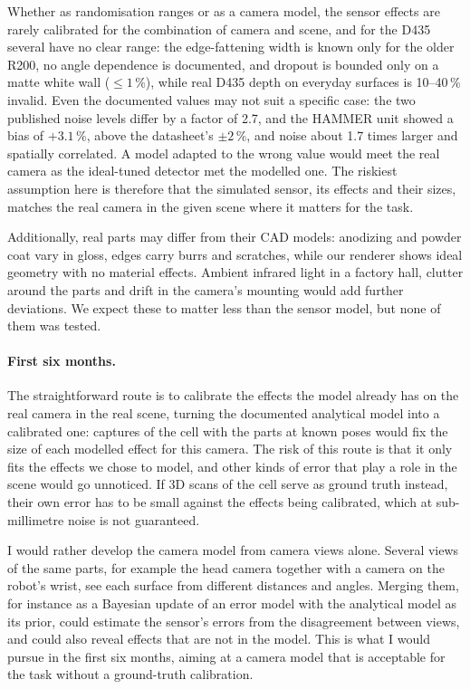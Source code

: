 \documentclass[10pt,a4paper]{article}
\begin{document}
Whether as randomisation ranges or as a camera model, the sensor
effects are rarely calibrated for the combination of camera and scene, and for the D435 several have no clear
range: the edge-fattening width is known only for the older R200, no angle dependence is documented, and
dropout is bounded only on a matte white wall ($\leq 1\,\%$), while real D435 depth on everyday surfaces is
10--40\,\% invalid. Even the documented values may not suit a
specific case: the two published noise levels differ by a factor of 2.7, and the HAMMER unit showed a bias of
$+3.1\,\%$, above the datasheet's $\pm 2\,\%$, and noise about 1.7 times larger and spatially correlated. A model
adapted to the wrong value would meet the real camera as the ideal-tuned detector met the modelled one. The riskiest
assumption here is therefore that the simulated sensor, its effects and their sizes, matches the real camera in the
given scene where it matters for the task.

Additionally, real parts may differ from their CAD models: anodizing and
powder coat vary in gloss, edges carry burrs and scratches, while our renderer shows ideal geometry with no material effects. Ambient infrared light in a factory
hall, clutter around the parts and drift in the camera's mounting would add further deviations. We expect these
to matter less than the sensor model, but none of them was tested.

\paragraph{First six months.} The straightforward route is to calibrate the effects the model already has on the real
camera in the real scene, turning the documented analytical model into a calibrated one: captures of the cell
with the parts at known poses would fix the size of each modelled effect for this camera. The risk of this route
is that it only fits the effects we chose to model, and other kinds of error that play a role in the scene would go
unnoticed. If 3D scans of the cell serve as ground truth instead, their own error has to be small against the
effects being calibrated, which at sub-millimetre noise is not guaranteed.

I would rather develop the camera model from camera views alone. Several views of the same parts, for example the head camera
together with a camera on the robot's wrist, see each surface from different distances and angles. Merging them,
for instance as a Bayesian update of an error model with the analytical model as its prior, could estimate the
sensor's errors from the disagreement between views, and could also reveal effects that are not in the model. This
is what I would pursue in the first six months, aiming at a camera model that is acceptable for the task without a
ground-truth calibration.
\end{document}
